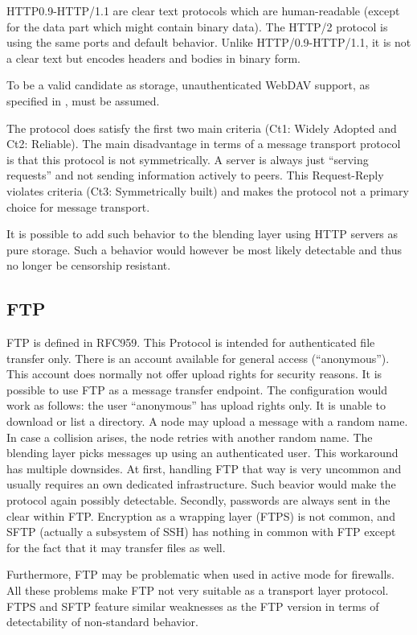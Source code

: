 HTTP0.9-HTTP/1.1 are clear text protocols which are human-readable (except for the data part which might contain binary data). The HTTP/2\cite{rfc7540} protocol is using the same ports and default behavior. Unlike HTTP/0.9-HTTP/1.1, it is not a clear text but encodes headers and bodies in binary form. 

To be a valid candidate as storage, unauthenticated WebDAV support, as specified in \cite{rfc4918}, must be assumed.

The protocol does satisfy the first two main criteria (Ct1: Widely Adopted and Ct2: Reliable). The main disadvantage in terms of a message transport protocol is that this protocol is not symmetrically. A server is always just ``serving requests'' and not sending information actively to peers. This Request-Reply violates criteria (Ct3: Symmetrically built) and makes the protocol not a primary choice for message transport. 

It is possible to add such behavior to the blending layer using HTTP servers as pure storage. Such a behavior would however be most likely detectable and thus no longer be censorship resistant.

\subsection{FTP}
FTP is defined in RFC959\cite{RFC959}. This Protocol is intended for authenticated file transfer only. There is an account available for general access (``anonymous''). This account does normally not offer upload rights for security reasons. It is possible to use FTP as a message transfer endpoint. The configuration would work as follows: the user ``anonymous'' has upload rights only. It is unable to download or list a directory. A node may upload a message with a random name. In case a collision arises, the node retries with another random name. The blending layer picks messages up using an authenticated user. This workaround has multiple downsides. At first, handling FTP that way is very uncommon and usually requires an own dedicated infrastructure. Such beavior would make the protocol again possibly detectable. Secondly, passwords are always sent in the clear within FTP. Encryption as a wrapping layer (FTPS) is not common, and SFTP (actually a subsystem of SSH) has nothing in common with FTP except for the fact that it may transfer files as well.

Furthermore, FTP may be problematic when used in active mode for firewalls. All these problems make FTP not very suitable as a transport layer protocol. FTPS and SFTP feature similar weaknesses as the FTP version in terms of detectability of non-standard behavior.

